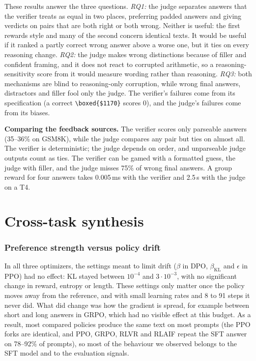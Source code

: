 \documentclass{article}
\begin{document}
These results answer the three questions. \emph{RQ1:} the judge separates answers that the verifier treats as equal in two places, preferring padded answers and giving verdicts on pairs that are both right or both wrong. Neither is useful: the first rewards style and many of the second concern identical texts. It would be useful if it ranked a partly correct wrong answer above a worse one, but it ties on every reasoning change. \emph{RQ2:} the judge makes wrong distinctions because of filler and confident framing, and it does not react to corrupted arithmetic, so a reasoning-sensitivity score from it would measure wording rather than reasoning. \emph{RQ3:} both mechanisms are blind to reasoning-only corruption, while wrong final answers, distractors and filler fool only the judge. The verifier's failures come from its specification (a correct \texttt{\textbackslash boxed\{\$1170\}} scores 0), and the judge's failures come from its biases.

\textbf{Comparing the feedback sources.} The verifier scores only parseable answers (35--36\% on GSM8K), while the judge compares any pair but ties on almost all. The verifier is deterministic; the judge depends on order, and unparseable judge outputs count as ties. The verifier can be gamed with a formatted guess, the judge with filler, and the judge misses 75\% of wrong final answers. A group reward for four answers takes 0.005\,ms with the verifier and 2.5\,s with the judge on a T4.

\section{Cross-task synthesis}

\subsubsection*{Preference strength versus policy drift}
In all three optimizers, the settings meant to limit drift ($\beta$ in DPO, $\beta_{\text{KL}}$ and $\epsilon$ in PPO) had no effect: KL stayed between $10^{-4}$ and $3\cdot10^{-3}$, with no significant change in reward, entropy or length. These settings only matter once the policy moves away from the reference, and with small learning rates and 8 to 91 steps it never did. What did change was how the gradient is spread, for example between short and long answers in GRPO, which had no visible effect at this budget. As a result, most compared policies produce the same text on most prompts (the PPO forks are identical, and PPO, GRPO, RLVR and RLAIF repeat the SFT answer on 78--92\% of prompts), so most of the behaviour we observed belongs to the SFT model and to the evaluation signals.
\end{document}

